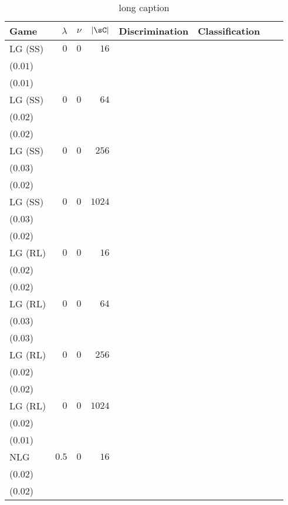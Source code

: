 \begin{table}[t]
\centering
\caption[short caption]{long caption}
\label{table:etl_imagenet_05_train}
\begin{tabular}{lrrrrrrr}
\toprule
Game & \(\lambda\) & \(\nu\) & \(|\mathcal{\sC}|\) & \multicolumn{1}{c}{Discrimination} & \multicolumn{1}{c}{Classification} \\[1ex]
\midrule
LG {\scriptsize(SS)} & \(0\) & \(0\) & \(16\) & \longcell{\(0.06\)\\{\tiny(\(0.01\))}} & \longcell{\(0.04\)\\{\tiny(\(0.01\))}} \\[2.2ex]
LG {\scriptsize(SS)} & \(0\) & \(0\) & \(64\) & \longcell{\(0.09\)\\{\tiny(\(0.02\))}} & \longcell{\(0.06\)\\{\tiny(\(0.02\))}} \\[2.2ex]
LG {\scriptsize(SS)} & \(0\) & \(0\) & \(256\) & \longcell{\(0.10\)\\{\tiny(\(0.03\))}} & \longcell{\(0.05\)\\{\tiny(\(0.02\))}} \\[2.2ex]
LG {\scriptsize(SS)} & \(0\) & \(0\) & \(1024\) & \longcell{\(0.17\)\\{\tiny(\(0.03\))}} & \longcell{\(0.07\)\\{\tiny(\(0.02\))}} \\[2.2ex]
LG {\scriptsize(RL)} & \(0\) & \(0\) & \(16\) & \longcell{\(0.11\)\\{\tiny(\(0.02\))}} & \longcell{\(0.04\)\\{\tiny(\(0.02\))}} \\[2.2ex]
LG {\scriptsize(RL)} & \(0\) & \(0\) & \(64\) & \longcell{\(0.22\)\\{\tiny(\(0.03\))}} & \longcell{\(0.06\)\\{\tiny(\(0.03\))}} \\[2.2ex]
LG {\scriptsize(RL)} & \(0\) & \(0\) & \(256\) & \longcell{\(0.31\)\\{\tiny(\(0.02\))}} & \longcell{\(0.07\)\\{\tiny(\(0.02\))}} \\[2.2ex]
LG {\scriptsize(RL)} & \(0\) & \(0\) & \(1024\) & \longcell{\(0.36\)\\{\tiny(\(0.02\))}} & \longcell{\(0.06\)\\{\tiny(\(0.01\))}} \\[2.2ex]
NLG & \(0.5\) & \(0\) & \(16\) & \longcell{\(0.13\)\\{\tiny(\(0.02\))}} & \longcell{\(0.06\)\\{\tiny(\(0.02\))}} \\[2.2ex]

\end{tabular}
\end{table}
